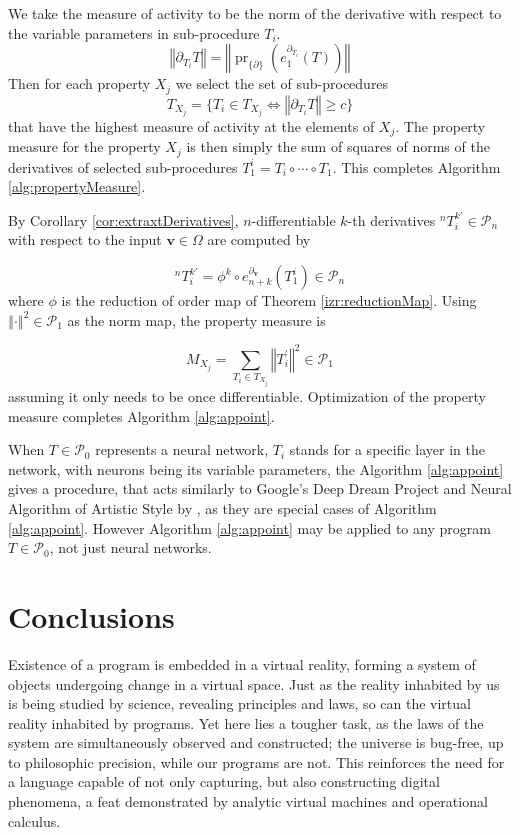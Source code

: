 \documentclass[11pt]{article}
\newcommand{\vv}{\mathbf{v}}
\newcommand{\dP}{\mathcal{P}}
\newcommand{\D}{\partial}
\DeclareMathOperator{\proj}{pr}
\begin{document}
   We take the measure of activity to be the norm of the derivative with respect to the variable parameters in sub-procedure $T_i$.
   $$\left\Vert\D_{T_i}T\right\Vert=\left\Vert \proj_{\{\D\}}\left(e^{\D_{T_i}}_1(T)\right)\right\Vert$$
   Then for each property $X_j$ we select the set of sub-procedures 
   $$T_{X_j}=\{T_i\in T_{X_j}\iff \left\Vert\D_{T_i}T\right\Vert\ge c\}$$
   that have the highest measure of activity at the elements of $X_j$. The property measure for the property $X_j$ is then simply the sum of squares of norms of the derivatives of selected sub-procedures $T^i_1=T_i\circ\cdots\circ T_1$. This completes Algorithm \ref{alg:propertyMeasure}. 
   
   By Corollary \ref{cor:extraxtDerivatives}, $n$-differentiable $k$-th derivatives $^{n}T^{k\prime}_i\in\dP_n$ with respect to the input $\vv\in\Omega$ are computed by
   
   \begin{equation*}
   ^{n}T^{k\prime}_i=\phi^k\circ e^{\D_\vv}_{n+k}(T^i_1)\in\dP_n
   \end{equation*}
   where $\phi$ is the reduction of order map of Theorem \ref{izr:reductionMap}.
   Using $\left\Vert\cdot\right\Vert^2\in\dP_1$ as the norm map, the property measure is
   
   \begin{equation*}
   M_{X_j}=\sum\limits_{T_i\in T_{X_j}} \left\Vert T^\prime_i\right\Vert^2\in\dP_1
   \end{equation*}
   assuming it only needs to be once differentiable. Optimization of the property measure completes Algorithm \ref{alg:appoint}.
   
   When $T\in\dP_0$ represents a neural network, $T_i$ stands for a specific
   layer in the network, with neurons being its variable parameters, the
   Algorithm \ref{alg:appoint} gives a procedure, that acts similarly to
   Google's Deep Dream Project \citep[see][]{DeepDream} and Neural Algorithm of
   Artistic Style by \cite{artNet}, as they are special cases of Algorithm \ref{alg:appoint}. 
However Algorithm \ref{alg:appoint} may be applied to any program $T\in\dP_0$, not just neural networks.

 \section{Conclusions}

Existence of a program is embedded in a virtual reality, forming a system of
objects undergoing change in a virtual space. Just as the reality inhabited by
us is being studied by science, revealing principles and laws, so can the
virtual reality inhabited by programs. Yet here lies a tougher task, as the laws
of the system are simultaneously observed and constructed; the universe is
bug-free, up to philosophic precision, while our programs are not. This
reinforces the need for a language capable of not only capturing, but also
constructing digital phenomena, a feat demonstrated by analytic virtual machines
and operational calculus. 
\end{document}
